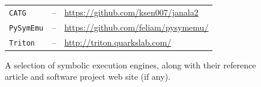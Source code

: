 \begin{figure}[t]
\begin{adjustbox}{width=1\columnwidth}
\begin{tabular}{| l || c || l |}
    {\tt CATG} & -- & \url{https://github.com/ksen007/janala2} \\
    {\tt PySymEmu} & -- & \url{https://github.com/feliam/pysymemu/} \\
    {\tt Triton} & -- & \url{http://triton.quarkslab.com/} \\
    \hline  
  \end{tabular}
  \end{adjustbox}
  \caption{A selection of symbolic execution engines, along with their reference article and software project web site (if any).}
  \label{tab:symbolic-engines}
\end{figure}

